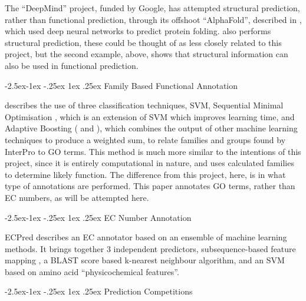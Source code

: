 \documentclass[12pt]{article}
\makeatletter
\renewcommand\paragraph{\@startsection{paragraph}{4}{\z@}
            {-2.5ex\@plus -1ex \@minus -.25ex}
            {1ex \@plus .25ex}
            {\normalfont\normalsize\bfseries}}
\renewcommand\subsection{\@startsection{subsection}{4}{\z@}
            {-2.5ex\@plus -1ex \@minus -.25ex}
            {1ex \@plus .25ex}
            {\normalfont\Large\bfseries}}
\makeatother
\begin{document}
			
			The \enquote{DeepMind} project, funded by Google, has attempted structural prediction, rather than functional prediction, through its offshoot \enquote{AlphaFold}, described in \cite{RefWorks:doc:5d89ec21e4b02d8374a7bbe7}, which used deep neural networks to predict protein folding. \cite{RefWorks:doc:5d822dd5e4b07f40b9eae2f4} also performs structural prediction, these could be thought of as less closely related to this project, but the second example, above, shows that structural information can also be used in functional prediction.  
		
			\paragraph{Family Based Functional Annotation}
			
			\cite{RefWorks:doc:5d88a6d8e4b08db974488b16} describes the use of three classification techniques, SVM, Sequential Minimal Optimisation \citep{RefWorks:doc:5d88bafce4b0d12609fd641e}, which is an extension of SVM which improves learning time, and Adaptive Boosting (\cite{RefWorks:doc:5d88b8c6e4b0732b5fdb9dd5} and \cite{RefWorks:doc:5d88b89ce4b0d12609fd639c}), which combines the output of other machine learning techniques to produce a weighted sum, to relate families and groups found by InterPro \citep{RefWorks:doc:5d88a822e4b0d12609fd5fc4} to GO terms.  This method is much more similar to the intentions of this project, since it is entirely computational in nature, and uses calculated families to determine likely function.  The difference from this project, here, is in what type of annotations are performed. This paper annotates GO terms, rather than EC numbers, as will be attempted here. 
		
			\paragraph{EC Number Annotation}
			
			ECPred \citep{RefWorks:doc:5de3d278e4b01e3d2320d227} describes an EC annotator based on an ensemble of machine learning methods. It brings together 3 independent predictors, subsequence-based feature mapping \citep{RefWorks:doc:5de3d288e4b01e3d2320d23f}, a BLAST score based k-nearest neighbour algorithm, and an SVM based on amino acid \enquote{physicochemical features}.
		

		\subsection{Prediction Competitions}
		\label{intro:competitions}
			
\end{document}
